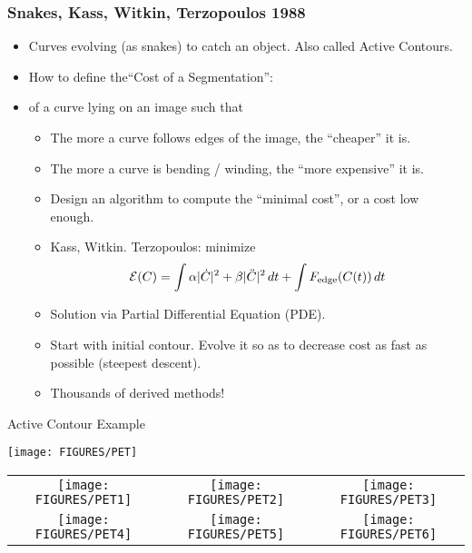 \documentclass[9pt]{beamer}
\newcommand{\myemph}[1]{{\color{blue}{#1}}}
\begin{document}
\begin{frame}\frametitle {Snakes, Kass, Witkin, Terzopoulos 1988}
  \begin{itemize}
  \item Curves evolving (as snakes) to catch an object. Also called Active Contours.
  \item How to define the``Cost of a Segmentation'':
  \item \myemph{Cost} of a curve lying on an image such that
    \begin{itemize}
    \item The more a curve follows edges of the image, the ``cheaper'' it is. \vfill
    \item The more a curve is bending / winding, the ``more expensive'' it is.\vfill
    \item Design an algorithm to compute the ``minimal cost'', or a cost low enough. \vfill
    \item Kass, Witkin. Terzopoulos: minimize
      $$
      {\mathcal E}(C) = \int \alpha|\dot{C}|^2+ \beta|\ddot{C}|^2\,dt + \int F_{\text{edge}}(C(t))\,dt
      $$
    \item Solution via Partial Differential Equation (PDE).\vfill
    \item  Start with initial contour. Evolve it so as to decrease cost as fast as possible (steepest descent).\vfill
    \item Thousands of derived methods!
    \end{itemize}
  \end{itemize}

\end{frame}




\begin{frame}[t]{Active Contour Example}
  \begin{center}
    \texttt{[image: FIGURES/PET]}
  \end{center}
  \begin{center}
    \begin{tabular}[h]{ccc}
       \texttt{[image: FIGURES/PET1]}&
       \texttt{[image: FIGURES/PET2]}&
       \texttt{[image: FIGURES/PET3]}\\
       \texttt{[image: FIGURES/PET4]}&
       \texttt{[image: FIGURES/PET5]}&
       \texttt{[image: FIGURES/PET6]}
    \end{tabular}
  \end{center}
\end{frame}
\end{document}
